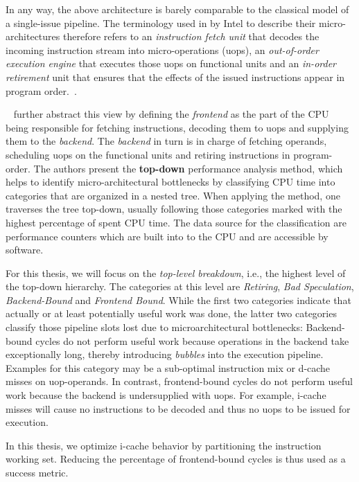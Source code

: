 \documentclass[12pt,a4paper]{book}
\begin{document}
In any way, the above architecture is barely comparable to the classical model of a single-issue pipeline.
The terminology used in by Intel to describe their micro-architectures therefore refers to
an \emph{instruction fetch unit} that decodes the incoming instruction stream into micro-operations (uops),
an \emph{out-of-order execution engine} that executes those uops on functional units and
an \emph{in-order retirement} unit that ensures that the effects of the issued instructions appear in program order.~\cite{intelArchPipeline}.

\citeauthor{yasinTopdown}~\cite{yasinTopdown} further abstract this view by defining the
\emph{frontend} as the part of the CPU being responsible for fetching instructions, decoding them to uops and supplying them to the \emph{backend}.
The \emph{backend} in turn is in charge of fetching operands, scheduling uops on the functional units and retiring instructions in program-order.
The authors present the \textbf{top-down} performance analysis method, which helps to identify micro-architectural bottlenecks by classifying CPU time into categories that are organized in a nested tree.
When applying the method, one traverses the tree top-down, usually following those categories marked with the highest percentage of spent CPU time.
The data source for the classification are performance counters which are built into to the CPU and are accessible by software.

For this thesis, we will focus on the \emph{top-level breakdown}, i.e., the highest level of the top-down hierarchy.
The categories at this level are \emph{Retiring}, \emph{Bad Speculation}, \emph{Backend-Bound} and  \emph{Frontend Bound}.
While the first two categories indicate that actually or at least potentially useful work was done, the latter two categories classify those pipeline slots lost due to microarchitectural bottlenecks:
Backend-bound cycles do not perform useful work because operations in the backend take exceptionally long, thereby introducing \emph{bubbles} into the execution pipeline.
Examples for this category may be a sub-optimal instruction mix or d-cache misses on uop-operands.
In contrast, frontend-bound cycles do not perform useful work because the backend is undersupplied with uops.
For example, i-cache misses will cause no instructions to be decoded and thus no uops to be issued for execution.~\cite{yasinTopdown,intelVtuneHelpRef,intelArchPipeline}

In this thesis, we optimize i-cache behavior by partitioning the instruction working set.
Reducing the percentage of frontend-bound cycles is thus used as a success metric.
\end{document}
